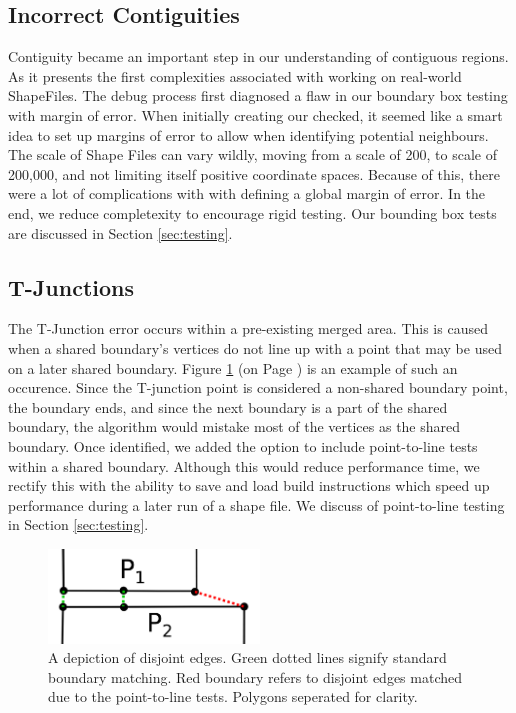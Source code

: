 \subsection{Incorrect Contiguities} \label{sec:contigVis}
Contiguity became an important step in our understanding of contiguous regions. As it presents the first complexities associated with working on real-world ShapeFiles. The debug process first diagnosed a flaw in our boundary box testing with margin of error. When initially creating our checked, it seemed like a smart idea to set up margins of error to allow when identifying potential neighbours. The scale of Shape Files can vary wildly, moving from a scale of 200, to scale of 200,000, and not limiting itself positive coordinate spaces. Because of this, there were a lot of complications with with defining a global margin of error. In the end, we reduce completexity to encourage rigid testing. Our bounding box tests are discussed in Section \ref{sec:testing}.

\subsection{T-Junctions}
The T-Junction error occurs within a pre-existing merged area. This is caused when a shared boundary's vertices do not line up with a point that may be used on a later shared boundary.
Figure \ref{fig:t-junction} (on Page \pageref{fig:t-junction}) is an example of such an occurence. Since the T-junction point is considered a non-shared boundary point, the boundary ends, and since the next boundary is a part of the shared boundary, the algorithm would mistake most of the vertices as the shared boundary. Once identified, we added the option to include point-to-line tests within a shared boundary. Although this would reduce performance time, we rectify this with the ability to save and load build instructions which speed up performance during a later run of a shape file. We discuss of point-to-line testing in Section \ref{sec:testing}.

\begin{figure}[b]
\includegraphics[width=0.5\textwidth]{images/ch6/t-junctoZoom2}
\caption{A depiction of disjoint edges. Green dotted lines signify standard boundary matching.  Red boundary refers to disjoint edges matched due to the point-to-line tests. Polygons seperated for clarity. }\label{fig:t-junction}
\end{figure} 

